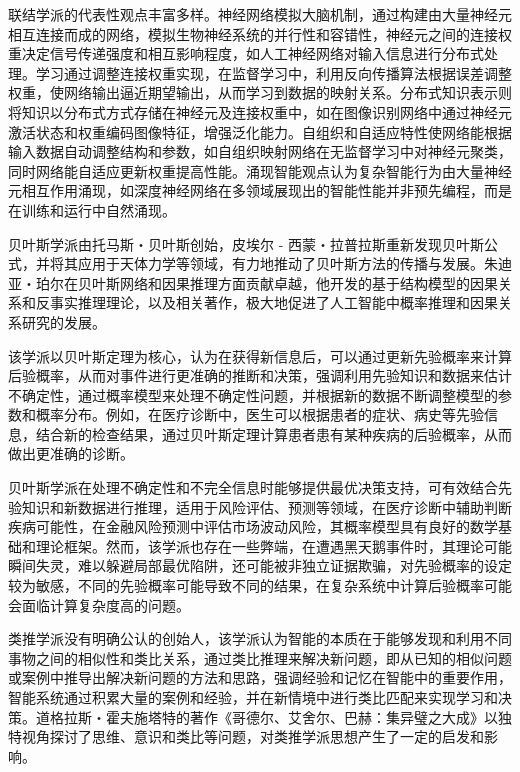 联结学派的代表性观点丰富多样。神经网络模拟大脑机制，通过构建由大量神经元相互连接而成的网络，模拟生物神经系统的并行性和容错性，神经元之间的连接权重决定信号传递强度和相互影响程度，如人工神经网络对输入信息进行分布式处理。学习通过调整连接权重实现，在监督学习中，利用反向传播算法根据误差调整权重，使网络输出逼近期望输出，从而学习到数据的映射关系。分布式知识表示则将知识以分布式方式存储在神经元及连接权重中，如在图像识别网络中通过神经元激活状态和权重编码图像特征，增强泛化能力。自组织和自适应特性使网络能根据输入数据自动调整结构和参数，如自组织映射网络在无监督学习中对神经元聚类，同时网络能自适应更新权重提高性能。涌现智能观点认为复杂智能行为由大量神经元相互作用涌现，如深度神经网络在多领域展现出的智能性能并非预先编程，而是在训练和运行中自然涌现。





贝叶斯学派由托马斯・贝叶斯创始，皮埃尔 - 西蒙・拉普拉斯重新发现贝叶斯公式，并将其应用于天体力学等领域，有力地推动了贝叶斯方法的传播与发展。朱迪亚・珀尔在贝叶斯网络和因果推理方面贡献卓越，他开发的基于结构模型的因果关系和反事实推理理论，以及相关著作，极大地促进了人工智能中概率推理和因果关系研究的发展。


该学派以贝叶斯定理为核心，认为在获得新信息后，可以通过更新先验概率来计算后验概率，从而对事件进行更准确的推断和决策，强调利用先验知识和数据来估计不确定性，通过概率模型来处理不确定性问题，并根据新的数据不断调整模型的参数和概率分布。例如，在医疗诊断中，医生可以根据患者的症状、病史等先验信息，结合新的检查结果，通过贝叶斯定理计算患者患有某种疾病的后验概率，从而做出更准确的诊断。


贝叶斯学派在处理不确定性和不完全信息时能够提供最优决策支持，可有效结合先验知识和新数据进行推理，适用于风险评估、预测等领域，在医疗诊断中辅助判断疾病可能性，在金融风险预测中评估市场波动风险，其概率模型具有良好的数学基础和理论框架。然而，该学派也存在一些弊端，在遭遇黑天鹅事件时，其理论可能瞬间失灵，难以躲避局部最优陷阱，还可能被非独立证据欺骗，对先验概率的设定较为敏感，不同的先验概率可能导致不同的结果，在复杂系统中计算后验概率可能会面临计算复杂度高的问题。



类推学派没有明确公认的创始人，该学派认为智能的本质在于能够发现和利用不同事物之间的相似性和类比关系，通过类比推理来解决新问题，即从已知的相似问题或案例中推导出解决新问题的方法和思路，强调经验和记忆在智能中的重要作用，智能系统通过积累大量的案例和经验，并在新情境中进行类比匹配来实现学习和决策。道格拉斯・霍夫施塔特的著作《哥德尔、艾舍尔、巴赫：集异璧之大成》以独特视角探讨了思维、意识和类比等问题，对类推学派思想产生了一定的启发和影响。



